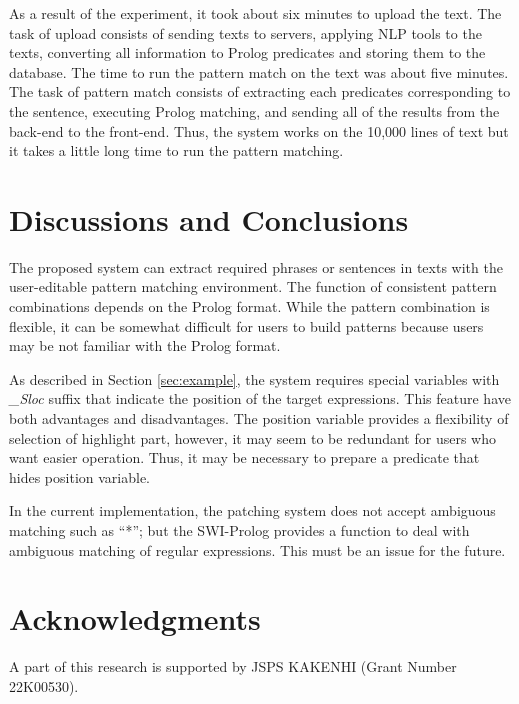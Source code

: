 \documentclass[conference]{IEEEtran}
\begin{document}
As a result of the experiment, it took about six minutes to upload the text.
The task of upload consists of sending texts to servers, applying NLP tools
to the texts, converting all information to Prolog predicates and storing them
to the database. 
The time to run the pattern match on the text was about five minutes.
The task of pattern match consists of extracting each predicates corresponding to the sentence,
executing Prolog matching, and sending all of the results from the back-end to the front-end. 
Thus, the system works on the 10,000 lines of text but it takes a little long time to run
the pattern matching. 

\section{Discussions and Conclusions}
The proposed system can extract required phrases or sentences in texts with the user-editable
pattern matching environment. The function of consistent pattern combinations depends on the Prolog format.
While the pattern combination is flexible, it can be somewhat difficult for users to build patterns
because users may be not familiar with the Prolog format.

As described in Section \ref{sec:example},
the system requires special variables with {\it \_Sloc} suffix that indicate the position of the
target expressions. This feature have both advantages and disadvantages. The position variable
provides a flexibility of selection of highlight part, however, it may seem to be redundant for
users who want easier operation. Thus, it may be necessary to prepare a predicate that hides
position variable. 

In the current implementation, the patching system does not accept ambiguous matching such as ``*'';
but the SWI-Prolog provides a function to deal with ambiguous matching of regular expressions. 
This must be an issue for the future.

\section*{Acknowledgments}
A part of this research is supported by JSPS KAKENHI (Grant Number 22K00530).





\end{document}
